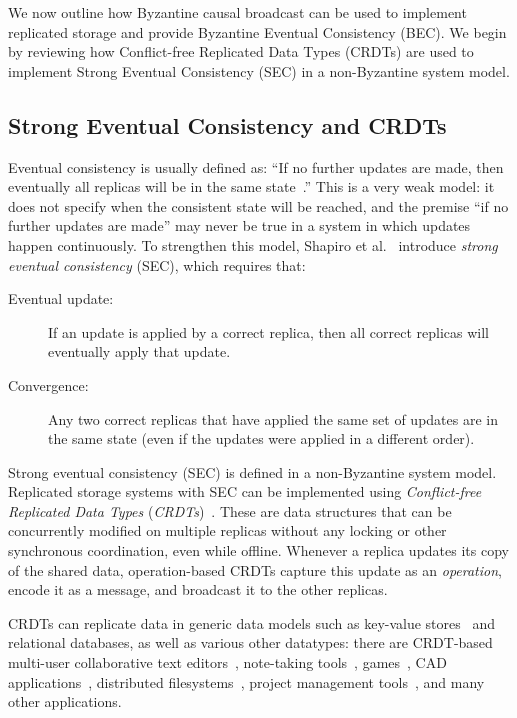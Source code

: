 \documentclass[a4paper,anonymous,USenglish]{lipics-v2019}
\begin{document}
We now outline how Byzantine causal broadcast can be used to implement replicated storage and provide Byzantine Eventual Consistency (BEC).
We begin by reviewing how Conflict-free Replicated Data Types (CRDTs) are used to implement Strong Eventual Consistency (SEC) in a non-Byzantine system model.

\subsection{Strong Eventual Consistency and CRDTs}

Eventual consistency is usually defined as: ``If no further updates are made, then eventually all replicas will be in the same state~\cite{Vogels:2009ca}.''
This is a very weak model: it does not specify when the consistent state will be reached, and the premise ``if no further updates are made'' may never be true in a system in which updates happen continuously.
To strengthen this model, Shapiro et al.~\cite{Shapiro:2011} introduce \emph{strong eventual consistency} (SEC), which requires that:

\begin{description}
\item[Eventual update:] If an update is applied by a correct replica, then all correct replicas will eventually apply that update.
\item[Convergence:] Any two correct replicas that have applied the same set of updates are in the same state (even if the updates were applied in a different order).
\end{description}

Strong eventual consistency (SEC) is defined in a non-Byzantine system model.
Replicated storage systems with SEC can be implemented using \emph{Conflict-free Replicated Data Types} (\emph{CRDTs})~\cite{Shapiro:2011}.
These are data structures that can be concurrently modified on multiple replicas without any locking or other synchronous coordination, even while offline.
Whenever a replica updates its copy of the shared data, operation-based CRDTs capture this update as an \emph{operation}, encode it as a message, and broadcast it to the other replicas.

CRDTs can replicate data in generic data models such as key-value stores~\cite{Akkoorath2016Cure,Zawirski2015SwiftCloud} and relational databases, as well as various other datatypes: there are CRDT-based multi-user collaborative text editors~\cite{Weiss:2009ht}, note-taking tools~\cite{vanHardenberg2020PushPin}, games~\cite{vanderLinde:2017fu}, CAD applications~\cite{Lv:2018ie}, distributed filesystems~\cite{Najafzadeh:2018bw,Tao:2015gd}, project management tools~\cite{Kleppmann2019localfirst}, and many other applications.
\end{document}
